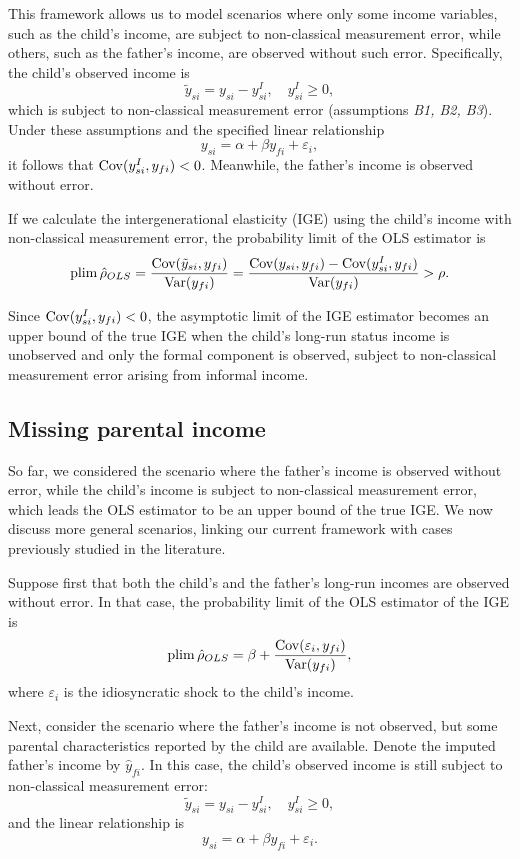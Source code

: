 This framework allows us to model scenarios where only some income variables, such as the child’s income, are subject to non-classical measurement error, while others, such as the father’s income, are observed without such error. Specifically, the child’s observed income is
\[
\tilde y_{si} = y_{si} - y_{si}^I, \quad y_{si}^I \ge 0,
\]
which is subject to non-classical measurement error (assumptions \emph{B1, B2, B3}). Under these assumptions and the specified linear relationship
\[
y_{si} = \alpha + \beta y_{fi} + \varepsilon_i,
\]
it follows that $\operatorname{Cov}(y^I_{si}, y_{fi}) < 0$. Meanwhile, the father’s income is observed without error.

If we calculate the intergenerational elasticity (IGE) using the child’s income with non-classical measurement error, the probability limit of the OLS estimator is
\[
\operatorname*{plim} \hat{\rho}_{OLS} = \frac{\operatorname{Cov}(\tilde{y}_{si}, y_{fi})}{\operatorname{Var}(y_{fi})} = \frac{\operatorname{Cov}(y_{si},y_{fi}) - \operatorname{Cov}(y^I_{si},y_{fi})}{\operatorname{Var}(y_{fi})} > \rho.
\]

Since $\operatorname{Cov}(y^I_{si},y_{fi}) < 0$, the asymptotic limit of the IGE estimator becomes an upper bound of the true IGE when the child’s long-run status income is unobserved and only the formal component is observed, subject to non-classical measurement error arising from informal income.

\subsection{Missing parental income}

So far, we considered the scenario where the father’s income is observed without error, while the child’s income is subject to non-classical measurement error, which leads the OLS estimator to be an upper bound of the true IGE. We now discuss more general scenarios, linking our current framework with cases previously studied in the literature.

Suppose first that both the child’s and the father’s long-run incomes are observed without error. In that case, the probability limit of the OLS estimator of the IGE is
\[
\operatorname*{plim} \hat{\rho}_{OLS} = \beta + \frac{\operatorname{Cov}(\varepsilon_i, y_{fi})}{\operatorname{Var}(y_{fi})},
\]
where $\varepsilon_i$ is the idiosyncratic shock to the child’s income.

Next, consider the scenario where the father’s income is not observed, but some parental characteristics reported by the child are available. Denote the imputed father’s income by $\hat{y}_{fi}$. In this case, the child’s observed income is still subject to non-classical measurement error:
\[
\tilde y_{si} = y_{si} - y_{si}^I, \quad y_{si}^I \ge 0,
\]
and the linear relationship is
\[
y_{si} = \alpha + \beta y_{fi} + \varepsilon_i.
\]


